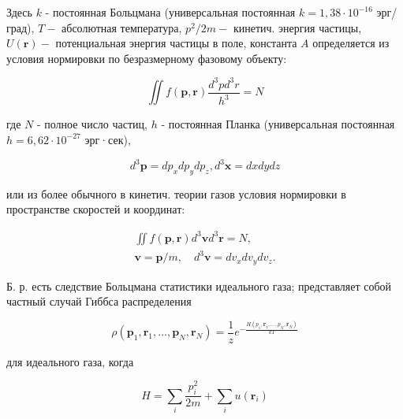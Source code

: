 \documentclass[10pt]{article}
\begin{document}
Здесь $k$ - постоянная Больцмана (универсальная постоянная $k=1,38 \cdot 10^{-16}$ эрг/град), $T-$ абсолютная температура, $p^{2} / 2 m-$ кинетич. энергия частицы, $U(\boldsymbol{r})-$ потенциальная энергия частицы в поле, константа $A$ определяется из условия нормировки по безразмерному фазовому объекту:



\[

\iint f(\boldsymbol{p}, \boldsymbol{r}) \frac{d^{3} p d^{3} r}{h^{3}}=N

\]



где $N$ - полное число частиц, $h$ - постоянная Планка (универсальная постоянная $h=6,62 \cdot 10^{-27}$ эрг·сек),



\[

d^{3} \boldsymbol{p}=d p_{x} d p_{y} d p_{z}, d^{3} \boldsymbol{x}=d x d y d z

\]



или из более обычного в кинетич. теории газов условия нормировки в пространстве скоростей и координат:



\[

\begin{gathered}

\iint f(\boldsymbol{p}, \boldsymbol{r}) d^{3} \boldsymbol{v} d^{3} \boldsymbol{r}=N, \\

\boldsymbol{v}=\boldsymbol{p} / m, \quad d^{3} \boldsymbol{v}=d v_{x} d v_{y} d v_{z} .

\end{gathered}

\]



Б. р. есть следствие Больцмана статистики идеального газа; представляет собой частный случай Гиббса распределения



\[

\rho\left(\boldsymbol{p}_{1}, \boldsymbol{r}_{1}, \ldots, \boldsymbol{p}_{N}, \boldsymbol{r}_{N}\right)=\frac{1}{z} e^{-\frac{H\left(p_{1}, \boldsymbol{r}_{1}, \ldots, p_{N}, \boldsymbol{r}_{N}\right)}{k T}}

\]



для идеального газа, когда



\[

H=\sum_{i} \frac{p_{i}^{2}}{2 m}+\sum_{i} u\left(\boldsymbol{r}_{i}\right)

\]
\end{document}
